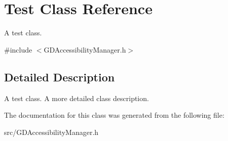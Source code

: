 \hypertarget{class_test}{
\section{Test Class Reference}
\label{class_test}
}


A test class.  


{\ttfamily \#include $<$GDAccessibilityManager.h$>$}

\subsection{Detailed Description}
A test class. A more detailed class description. 

The documentation for this class was generated from the following file:\begin{DoxyCompactItemize}
\item 
src/GDAccessibilityManager.h\end{DoxyCompactItemize}
